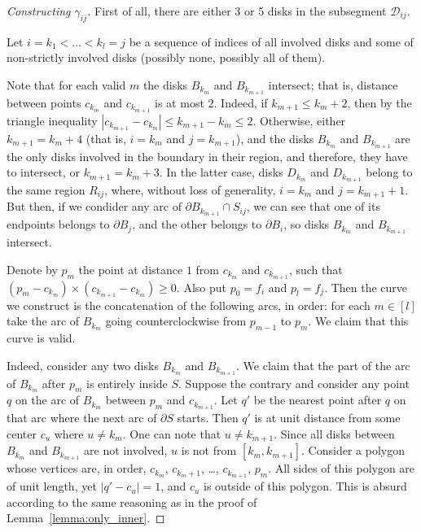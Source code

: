 \begin{proof}[Constructing $\gamma_{ij}$]
First of all, there are either 3 or 5 disks in the subsegment $\mathcal{D}_{ij}$.

Let $i = k_1 < \ldots < k_l = j$ be a sequence of indices of all involved disks and some of non-strictly involved disks (possibly none, possibly all of them).

Note that for each valid $m$ the disks $B_{k_m}$ and $B_{k_{m+1}}$ intersect; that is, distance between points $c_{k_m}$ and $c_{k_{m+1}}$ is at most $2$. Indeed, if $k_{m+1}\leq k_m + 2$, then by the triangle inequality $|c_{k_{m+1}} - c_{k_m}|\leq k_{m+1}-k_m\leq 2$. Otherwise, either $k_{m+1} = k_m + 4$ (that is, $i = k_m$ and $j = k_{m+1}$), and the disks $B_{k_m}$ and $B_{k_{m+1}}$ are the only disks involved in the boundary in their region, and therefore, they have to intersect, or $k_{m+1} = k_m + 3$. In the latter case, disks $D_{k_m}$ and $D_{k_{m+1}}$ belong to the same region $R_{ij}$, where, without loss of generality, $i = k_m$ and $j = k_{m+1} + 1$. But then, if we condider any arc of $\partial B_{k_{m+1}}\cap S_{ij}$, we can see that one of its endpoints belongs to $\partial B_j$, and the other belongs to $\partial B_i$, so disks $B_{k_m}$ and $B_{k_{m+1}}$ intersect.

Denote by $p_m$ the point at distance $1$ from $c_{k_m}$ and $c_{k_{m+1}}$, such that $(p_m - c_{k_m})\times(c_{k_{m+1}} - c_{k_m})\geq 0$. Also put $p_0 = f_i$ and $p_l = f_j$. Then the curve we construct is the concatenation of the following arcs, in order: for each $m\in[l]$ take the arc of $B_{k_m}$ going counterclockwise from $p_{m-1}$ to $p_m$. We claim that this curve is valid.

Indeed, consider any two disks $B_{k_m}$ and $B_{k_{m+1}}$. We claim that the part of the arc of $B_{k_m}$ after $p_m$ is entirely inside $S$. Suppose the contrary and consider any point $q$ on the arc of $B_{k_m}$ between $p_m$ and $c_{k_{m+1}}$. Let $q'$ be the nearest point after $q$ on that arc where the next arc of $\partial{S}$ starts. Then $q'$ is at unit distance from some center $c_u$ where $u\neq k_m$. One can note that $u\neq k_{m+1}$. Since all disks between $B_{k_m}$ and $B_{k_{m+1}}$ are not involved, $u$ is not from $[k_m, k_{m+1}]$. Consider a polygon whose vertices are, in order, $c_{k_m}$, $c_{k_m + 1}$, \ldots, $c_{k_{m+1}}$, $p_m$. All sides of this polygon are of unit length, yet $|q' - c_u| = 1$, and $c_u$ is outside of this polygon. This is absurd according to the same reasoning as in the proof of Lemma~\ref{lemma:only_inner}.

\end{proof}


